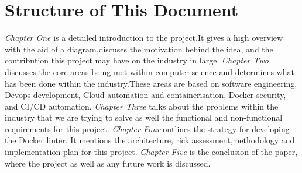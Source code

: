 \section{Structure of This Document}
\textit{Chapter One} is a detailed introduction to the project.It gives a high overview with the aid of a diagram,discuses the motivation behind the idea, and the contribution this project may have on the industry in large. 
\textit{Chapter Two} discusses the core areas being met within computer science and determines what has been done within the industry.These areas are based on software engineering, Devops development, Cloud automation and containerisation, Docker security, and CI/CD automation. 
\textit{Chapter Three} talks about the problems within the industry that we are trying to solve as well the functional and non-functional requirements for this project.
\textit{Chapter Four} outlines the strategy for developing the Docker linter. It mentions the architecture, rick assessment,methodology and implementation plan for this project. 
\textit{Chapter Five} is the conclusion of the paper, where the project as well as any future work is discussed. 